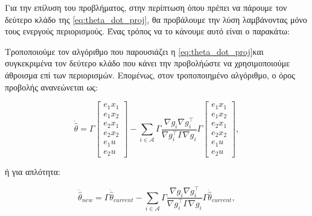 \documentclass[12pt]{article} %
\numberwithin{equation}{section}  %
\renewenvironment{examplebox}[1]{%
  \ifthenelse{\boolean{showexamples}}%
    {\begin{tcolorbox}[colback=white, colframe=gray!30, title={#1}, sharp corners, boxrule=0.5pt, coltitle=black]}%
    {\expandafter\comment}%
}{%
  \ifthenelse{\boolean{showexamples}}%
    {\end{tcolorbox}}%
    {\expandafter\endcomment}%
}
\begin{document}


Για την επίλυση του προβλήματος, στην περίπτωση όπου πρέπει να πάρουμε τον δεύτερο κλάδο της \eqref{eq:theta_dot_proj}, θα προβάλουμε την λύση λαμβάνοντας μόνο τους ενεργούς περιορισμούς. Ένας τρόπος να το κάνουμε αυτό είναι ο παρακάτω:

Τροποποιούμε τον αλγόριθμο που παρουσιάζει η \eqref{eq:theta_dot_proj}\textemdash και συγκεκριμένα τον δεύτερο κλάδο που κάνει την προβολή\textemdash ώστε να χρησιμοποιούμε άθροισμα επί των περιορισμών.
Επομένως, στον τροποποιημένο αλγόριθμο, ο όρος προβολής ανανεώνεται ως:

\begin{equation}\label{t1:theta_update}
    \dot{\hat{\theta}} = 
    \Gamma \begin{bmatrix} e_1 x_1 \\ e_1 x_2 \\ e_2 x_1 \\ e_2 x_2 \\ e_1 u \\ e_2 u \end{bmatrix} - 
    \sum_{i \in \mathcal{A}} \Gamma \frac{\nabla g_i \nabla g_i^{\top}}{\nabla g_i^{\top} \Gamma \nabla g_i} \Gamma \begin{bmatrix} e_1 x_1 \\ e_1 x_2 \\ e_2 x_1 \\ e_2 x_2 \\ e_1 u \\ e_2 u \end{bmatrix},
\end{equation}

ή για απλότητα:

\begin{equation}\label{eq:update_theta}
    \dot{\hat{\theta}}_{new} = 
    \Gamma \dot{\hat{\theta}}_{current} - 
    \sum_{i \in \mathcal{A}} \Gamma \frac{\nabla g_i \nabla g_i^{\top}}{\nabla g_i^{\top} \Gamma \nabla g_i} \Gamma \dot{\hat{\theta}}_{current},
\end{equation}
\end{document}
